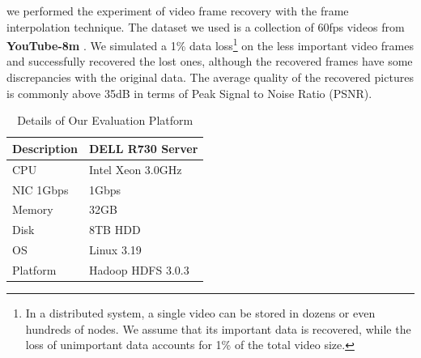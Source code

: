 \documentclass[sigconf]{acmart}
\begin{document}
we performed the experiment of video frame recovery with the frame interpolation technique. The dataset we used is a collection of 60fps videos from \textbf{YouTube-8m} \cite{youtube8m}. We simulated a 1\% data loss\footnote{In a distributed system, a single video can be stored in dozens or even hundreds of nodes. We assume that its important data is recovered, while the loss of unimportant data accounts for 1\% of the total video size.} on the less important video frames and successfully recovered the lost ones, although the recovered frames have some discrepancies with the original data. The average quality of the recovered pictures is commonly above 35dB in terms of Peak Signal to Noise Ratio (PSNR).

\begin{table}[!ht]\small
\begin{tabular}{|l|l|}
\hline
Description & DELL R730 Server \\ \hline
CPU & Intel Xeon 3.0GHz \\ \hline
NIC 1Gbps & 1Gbps \\ \hline
Memory & 32GB \\ \hline
Disk & 8TB HDD \\ \hline
OS & Linux 3.19 \\ \hline
Platform & Hadoop HDFS 3.0.3 \\ \hline
\end{tabular}
\vspace{3mm}
\caption{Details of Our Evaluation Platform}\label{tab-platform}
\vspace{-10mm}
\end{table}
\end{document}
